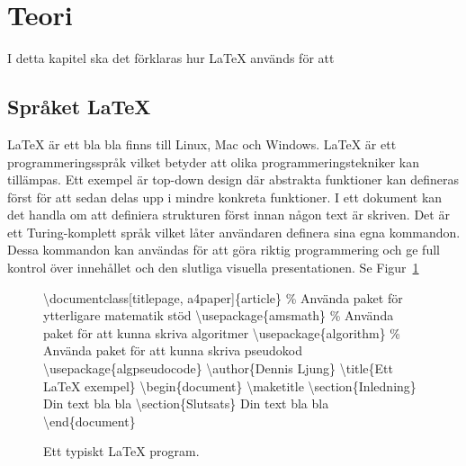 \section{Teori}
I detta kapitel ska det förklaras hur {\LaTeX} används för att 

\subsection{Språket {\LaTeX}} 
{\LaTeX} är ett bla bla finns till Linux, Mac och Windows.  
\newline
\newline
{\LaTeX} är ett programmeringsspråk vilket betyder att olika programmeringstekniker kan tillämpas. Ett exempel är top-down design där abstrakta funktioner kan defineras först för att sedan delas upp i mindre konkreta funktioner. I ett dokument kan det handla om att definiera strukturen först innan någon text är skriven. 
\newline
\newline
Det är ett Turing-komplett språk vilket låter användaren definera sina egna kommandon. Dessa kommandon kan användas för att göra riktig programmering och ge full kontrol över innehållet och den slutliga visuella presentationen. 
\newline
\newline
Se Figur~\ref{fig:latexexempel}
  
\begin{figure}[ht]
	\noindent\makebox[\linewidth]{\rule{\textwidth}{0.4pt}}
	\textbackslash documentclass[titlepage, a4paper]\{article\}
	\newline
	\newline
	\% Använda paket för ytterligare matematik stöd
	\newline
	\textbackslash usepackage\{amsmath\}
	\newline
	\% Använda paket för att kunna skriva algoritmer
	\newline
	\textbackslash usepackage\{algorithm\}
	\newline
	\% Använda paket för att kunna skriva pseudokod
	\newline
	\textbackslash usepackage\{algpseudocode\}
	\newline
	\newline
	\textbackslash author\{Dennis Ljung\}
	\newline
	\textbackslash title\{Ett {\LaTeX} exempel\}
	\newline
	\newline
	\textbackslash begin\{document\}
	\newline
	\textbackslash maketitle
	\newline
	\textbackslash section\{Inledning\}
	\newline
	Din text bla bla
	\newline
	\textbackslash section\{Slutsats\}
	\newline
	Din text bla bla
	\newline
	\textbackslash end\{document\}
	\newline
	\noindent\makebox[\linewidth]{\rule{\textwidth}{0.4pt}}
\caption{Ett typiskt {\LaTeX} program.}
\label{fig:latexexempel}
\end{figure} 

